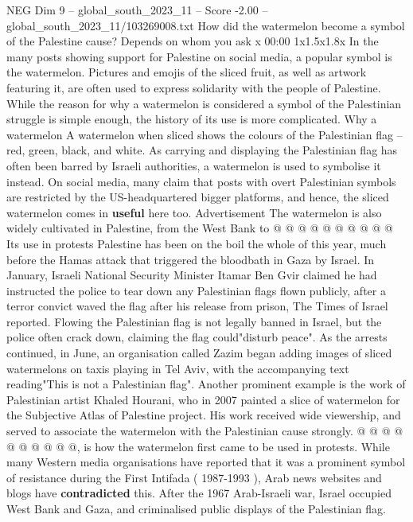 \begin{textsample}{NEG Dim 9 – global\_south\_2023\_11 – Score -2.00 – global\_south\_2023\_11/103269008.txt}  \label{ex:f9_neg_427}
How did the watermelon become a symbol of the Palestine cause?
Depends on whom you ask x 00:00 1x1.5x1.8x In the many posts showing support for Palestine on social media, a popular symbol is the watermelon.
Pictures and emojis of the sliced fruit, as well as artwork featuring it, are often used to express solidarity with the people of Palestine.
While the reason for why a watermelon is considered a symbol of the Palestinian struggle is simple enough, the history of its use is more complicated.
Why a watermelon A watermelon when sliced shows the colours of the Palestinian flag -- red, green, black, and white.
As carrying and displaying the Palestinian flag has often been barred by Israeli authorities, a watermelon is used to symbolise it instead.
On social media, many claim that posts with overt Palestinian symbols are restricted by the US-headquartered bigger platforms, and hence, the sliced watermelon comes in \textbf{useful} here too.
Advertisement The watermelon is also widely cultivated in Palestine, from the West Bank to @ @ @ @ @ @ @ @ @ @ Its use in protests Palestine has been on the boil the whole of this year, much before the Hamas attack that triggered the bloodbath in Gaza by Israel.
In January, Israeli National Security Minister Itamar Ben Gvir claimed he had instructed the police to tear down any Palestinian flags flown publicly, after a terror convict waved the flag after his release from prison, The Times of Israel reported.
Flowing the Palestinian flag is not legally banned in Israel, but the police often crack down, claiming the flag could"disturb peace".
As the arrests continued, in June, an organisation called Zazim began adding images of sliced watermelons on taxis playing in Tel Aviv, with the accompanying text reading"This is not a Palestinian flag".
Another prominent example is the work of Palestinian artist Khaled Hourani, who in 2007 painted a slice of watermelon for the Subjective Atlas of Palestine project.
His work received wide viewership, and served to associate the watermelon with the Palestinian cause strongly. @ @ @ @ @ @ @ @ @ @, is how the watermelon first came to be used in protests.
While many Western media organisations have reported that it was a prominent symbol of resistance during the First Intifada ( 1987-1993 ), Arab news websites and blogs have \textbf{contradicted} this.
After the 1967 Arab-Israeli war, Israel occupied West Bank and Gaza, and criminalised public displays of the Palestinian flag.

\end{textsample}
